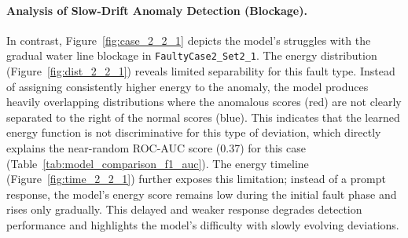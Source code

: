 \documentclass{article}
\begin{document}
\paragraph{Analysis of Slow-Drift Anomaly Detection (Blockage).} \label{sec:slow_drift_analysis}
In contrast, Figure~\ref{fig:case_2_2_1} depicts the model's struggles with the gradual water line blockage in \texttt{FaultyCase2\_Set2\_1}. The energy distribution (Figure~\ref{fig:dist_2_2_1}) reveals limited separability for this fault type. Instead of assigning consistently higher energy to the anomaly, the model produces heavily overlapping distributions where the anomalous scores (red) are not clearly separated to the right of the normal scores (blue). This indicates that the learned energy function is not discriminative for this type of deviation, which directly explains the near-random ROC-AUC score (0.37) for this case (Table~\ref{tab:model_comparison_f1_auc}). The energy timeline (Figure~\ref{fig:time_2_2_1}) further exposes this limitation; instead of a prompt response, the model's energy score remains low during the initial fault phase and rises only gradually. This delayed and weaker response degrades detection performance and highlights the model's difficulty with slowly evolving deviations.
\end{document}
